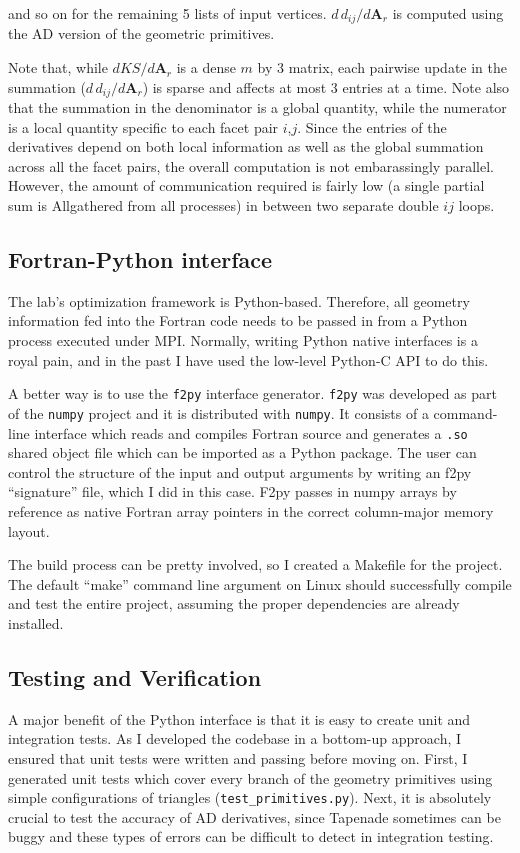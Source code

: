 \documentclass[11pt,letterpaper]{article}
\begin{document}
and so on for the remaining 5 lists of input vertices.
$d\,d_{ij}/d\textbf{A}_r$ is computed using the AD version of the geometric primitives.

\qquad Note that, while $dKS/d\textbf{A}_r$ is a dense $m$ by 3 matrix, each pairwise update in the summation ($d\,d_{ij}/d\textbf{A}_r$) is sparse and affects at most 3 entries at a time.
Note also that the summation in the denominator is a global quantity, while the numerator is a local quantity specific to each facet pair $i$,$j$.
Since the entries of the derivatives depend on both local information as well as the global summation across all the facet pairs, the overall computation is not embarassingly parallel.
However, the amount of communication required is fairly low (a single partial sum is Allgathered from all processes) in between two separate double $ij$ loops.

\subsection{Fortran-Python interface}
\qquad The lab's optimization framework is Python-based.
Therefore, all geometry information fed into the Fortran code needs to be passed in from a Python process executed under MPI.
Normally, writing Python native interfaces is a royal pain, and in the past I have used the low-level Python-C API to do this.

\qquad A better way is to use the \texttt{f2py} interface generator.
\texttt{f2py} was developed as part of the \texttt{numpy} project and it is distributed with \texttt{numpy}.
It consists of a command-line interface which reads and compiles Fortran source and generates a \texttt{.so} shared object file which can be imported as a Python package.
The user can control the structure of the input and output arguments by writing an f2py ``signature'' file, which I did in this case.
F2py passes in numpy arrays by reference as native Fortran array pointers in the correct column-major memory layout.

\qquad The build process can be pretty involved, so I created a Makefile for the project.
The default ``make'' command line argument on Linux should successfully compile and test the entire project, assuming the proper dependencies are already installed.

\subsection{Testing and Verification}
\qquad A major benefit of the Python interface is that it is easy to create unit and integration tests.
As I developed the codebase in a bottom-up approach, I ensured that unit tests were written and passing before moving on.
First, I generated unit tests which cover every branch of the geometry primitives using simple configurations of triangles (\texttt{test\_primitives.py}).
Next, it is absolutely crucial to test the accuracy of AD derivatives, since Tapenade sometimes can be buggy and these types of errors can be difficult to detect in integration testing.
\end{document}
